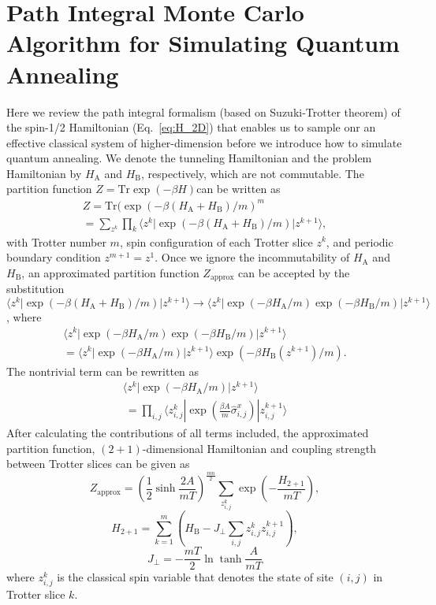 \documentclass[aps,pra,twocolumn,superscriptaddress]{revtex4-2}
\begin{document}
\section{Path Integral Monte Carlo Algorithm for Simulating Quantum Annealing\label{app:QMC}}
Here we review the path integral formalism (based on Suzuki-Trotter theorem) of the spin-1/2 Hamiltonian (Eq.~\eqref{eq:H_2D}) that enables us to sample onr an effective classical system of higher-dimension before we introduce how to simulate quantum annealing. We denote the tunneling Hamiltonian and the problem Hamiltonian by $H_\text{A}$ and $H_\text{B}$, respectively, which are not commutable. The partition function $Z=\text{Tr}\exp(-\beta H)$can be written as
\begin{eqnarray}
Z=\text{Tr}(\exp(-\beta(H_\text{A}+H_\text{B})/m)^m\\
=\sum_{z^k}\prod_{k}\langle z^k|\exp(-\beta(H_\text{A}+H_\text{B})/m)|z^{k+1}\rangle,
\end{eqnarray}
with Trotter number $m$, spin configuration of each Trotter slice $z^k$, and periodic boundary condition $z^{m+1}=z^1$. Once we ignore the incommutability of $H_\text{A}$ and $H_\text{B}$, an approximated partition function $Z_\text{approx}$ can be accepted by the substitution $\langle z^k|\exp(-\beta(H_\text{A}+H_\text{B})/m)|z^{k+1}\rangle\rightarrow\langle z^k|\exp(-\beta H_\text{A}/m)\exp(-\beta H_\text{B}/m)|z^{k+1}\rangle$, where
\begin{eqnarray}
\langle z^k|\exp(-\beta H_\text{A}/m)\exp(-\beta H_\text{B}/m)|z^{k+1}\rangle\\
=\langle z^k|\exp(-\beta H_\text{A}/m)|z^{k+1}\rangle\exp(-\beta H_\text{B}(z^{k+1})/m).
\end{eqnarray}
The nontrivial term can be rewritten as
\begin{eqnarray}
\langle z^k|\exp(-\beta H_\text{A}/m)|z^{k+1}\rangle\\\
=\prod_{i,j}\langle z_{i,j}^k|\exp(\frac{\beta A}{m}\hat{\sigma}_{i,j}^x)|z_{i,j}^{k+1}\rangle
\end{eqnarray}
After calculating the contributions of all terms included, the approximated partition function, $(2+1)$-dimensional Hamiltonian and coupling strength between Trotter slices can be given as
\begin{equation}
Z_\text{approx}=(\frac{1}{2}\sinh\frac{2A}{mT})^{\frac{mn}{2}}\sum_{z_{i,j}^k}\exp(-\frac{H_{2+1}}{mT}),
\end{equation}
\begin{equation}
H_{2+1}=\sum_{k=1}^m(H_\text{B}-J_\bot\sum_{i,j}z_{i,j}^kz_{i,j}^{k+1}),
\end{equation}
\begin{equation}
J_\bot=-\frac{mT}{2}\ln\tanh\frac{A}{mT}
\end{equation}
where $z_{i,j}^k$ is the classical spin variable that denotes the state of site $(i,j)$ in Trotter slice $k$. 
\end{document}
